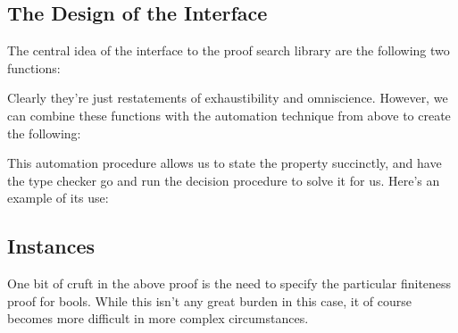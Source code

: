 \subsection{The Design of the Interface}
The central idea of the interface to the proof search library are the following
two functions:\\
\begin{minipage}{\linewidth}
  \begin{multicols}{2}
    \begin{agdalisting*}
    \end{agdalisting*} \columnbreak
    \begin{agdalisting*}
    \end{agdalisting*}
  \end{multicols}
\end{minipage}
Clearly they're just restatements of exhaustibility and omniscience.
However, we can combine these functions with the automation technique from above
to create the following:\\
\begin{minipage}{\linewidth}
  \begin{multicols}{2}
    \begin{agdalisting*}
    \end{agdalisting*} \columnbreak
    \begin{agdalisting*}
    \end{agdalisting*}
  \end{multicols}
\end{minipage}

This automation procedure allows us to state the property succinctly, and have
the type checker go and run the decision procedure to solve it for us.
Here's an example of its use:
\begin{agdalisting*}
\end{agdalisting*}

\subsection{Instances}
One bit of cruft in the above proof is the need to specify the particular
finiteness proof for bools.
While this isn't any great burden in this case, it of course becomes more
difficult in more complex circumstances.

